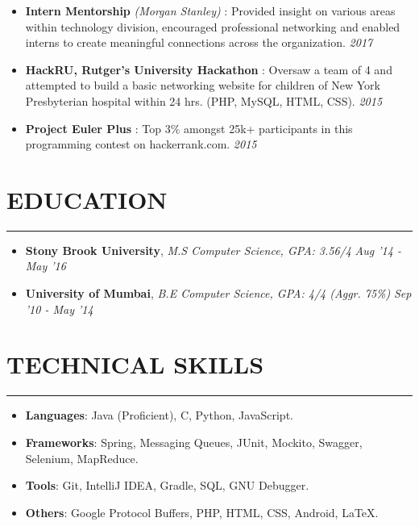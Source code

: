 \documentclass[12pt]{article}
\newcommand{\sectionHeading}[1]{
\vspace{-15pt}
\section*{\small{#1}}
\vspace{-10pt}
\hrule
\vspace{8pt}
}
\newcommand{\sectionListStart}{
    \begin{itemize}[label={\small{\textbullet}}, leftmargin=20pt] %
}
\newcommand{\sectionListStartWiderSpacing}{
    \begin{itemize}[label={\small{\textbullet}}, leftmargin=20pt, itemsep=-2pt] %
}
\newcommand{\sectionListStartNoBulletWiderSpacing}{
    \begin{itemize}[label={}, leftmargin=0pt, itemsep=-2pt] %
}
\newcommand{\sectionListEnd}{\end{itemize} \vspace{-5pt}}
\newcommand{\sectionListItemWithDate}[2]{\item \small{#1 \hfill \textit{#2}}}
\newcommand{\eduListItemWithDate}[3]{\item \small{\textbf{#1}, \textit{#2} \hfill \textit{#3}}}
\newcommand{\sectionListSubItem}[1]{\subitem \small{#1}}
\newcommand{\technologiesListItem}[2]{
\item \small{\textbf{#1}: #2
}}
\begin{document}
\sectionListStartWiderSpacing
\sectionListItemWithDate{\textbf{Intern Mentorship} \textit{(Morgan Stanley)} : Provided insight on various areas within technology division, encouraged professional networking and enabled interns to create meaningful connections across the organization.}{2017}

\sectionListItemWithDate{\textbf{HackRU, Rutger's University Hackathon} : Oversaw a team of 4 and attempted to build a basic networking website for children of New York Presbyterian hospital within 24 hrs. (PHP, MySQL, HTML, CSS).}{2015}

\sectionListItemWithDate{\textbf{Project Euler Plus} : Top 3\% amongst 25k+ participants in this programming contest on hackerrank.com.}{2015}

%     

\sectionListEnd






\sectionHeading{EDUCATION}
\sectionListStartNoBulletWiderSpacing
\eduListItemWithDate
{Stony Brook  University}{M.S Computer Science, GPA: 3.56/4}{Aug '14 - May '16}

\eduListItemWithDate
{University of Mumbai}{B.E Computer Science, GPA: 4/4 (Aggr. 75\%)}{Sep '10 - May '14}
\sectionListEnd
\sectionHeading{TECHNICAL SKILLS}
\sectionListStart
    \technologiesListItem{Languages}{Java (Proficient), C, Python, JavaScript.}
    
    \technologiesListItem{Frameworks}{Spring, Messaging Queues, JUnit, Mockito, Swagger, Selenium, MapReduce.}
    
    \technologiesListItem{Tools}{Git, IntelliJ IDEA, Gradle, SQL, GNU Debugger.}
    
    \technologiesListItem{Others}{Google Protocol Buffers, PHP, HTML, CSS, Android, \LaTeX.}
\sectionListEnd

\end{document}
